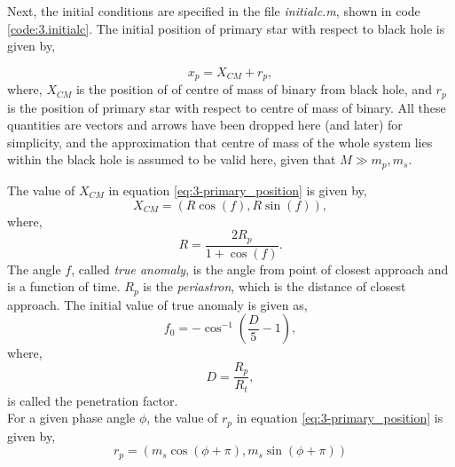 \documentclass[a4paper]{article}
\begin{document}
\begin{enumerate} [label*=\textbf{(\alph*)}]
					\begin{figure}
						
					\end{figure}
					
					Next, the initial conditions are specified in the file \emph{initialc.m}, shown in code \ref{code:3.initialc}. The initial position of primary star with respect to black hole is given by,
					
					\begin{equation}
						x_p = X_{CM}^{} +r_p,
						\label{eq:3-primary_position}
					\end{equation}
					where, \(X_{CM}\) is the position of of centre of mass of binary from black hole, and \(r_p\) is the position of primary star with respect to centre of mass of binary. All these quantities are vectors and arrows have been dropped here (and later) for simplicity, and the approximation that centre of mass of the whole system lies within the black hole is assumed to be valid here, given that \(M \gg m_p,m_s\). 
					
					The value of \(X_{CM}^{}\) in equation \ref{eq:3-primary_position} is given by, 
					\begin{equation}
						X_{CM}^{} = (R \cos(f), R \sin(f)),
						\label{eq:3-xcm}
					\end{equation}
					where,
					\begin{equation}
						R = \frac{2 R_p}{1+ \cos(f)}.
						\label{eq:3-r}
					\end{equation}
					The angle \(f\), called \emph{true anomaly}, is the angle from point of closest approach and is a function of time. \(R_p\) is the \emph{periastron}, which is the distance of closest approach. The initial value of true anomaly is given as,
					\begin{equation}
						f_0 = - \cos^{-1} \left( \frac{D}{5} -1 \right),
						\label{eq:3-true_anomaly} 
					\end{equation}
					where, 
					\begin{equation}
						D = \frac{R_p}{R_t},
						\label{eq:3-d}
					\end{equation}
					is called the penetration factor.\\
					
					For a given phase angle \(\phi\), the value of \(r_p\) in equation \ref{eq:3-primary_position} is given by,
					\begin{equation}
						r_p = (m_s \cos(\phi+\pi), m_s \sin (\phi+\pi))
						\label{eq:3-rp}
					\end{equation}
					

\end{enumerate}
\end{document}
